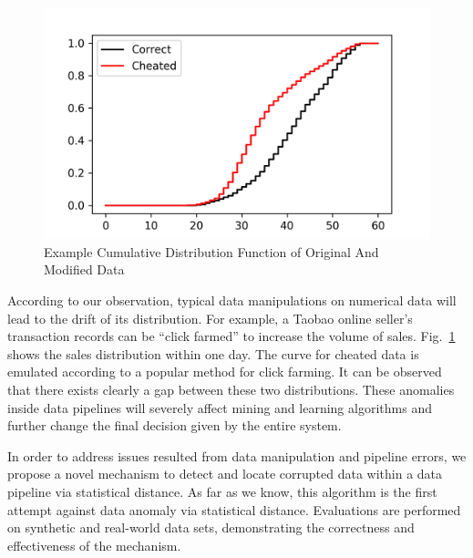 \documentclass[a4paper]{IEEEtran}
\begin{document}
		\begin{figure}[!t]
			\centering
			\includegraphics[width=\linewidth]{fig/ExampleEcdf.png}
			\caption{Example Cumulative Distribution Function of Original And Modified Data}
			\label{fig:example-ecdf}
		\end{figure}
		
		According to our observation, typical data manipulations on numerical data will lead to the drift of its distribution. For example, a Taobao online seller's transaction records can be ``click farmed'' to increase the volume of sales. Fig.~\ref{fig:example-ecdf} shows the sales distribution within one day. The curve for cheated data is emulated according to a popular method for click farming. It can be observed that there exists clearly a gap between these two distributions. 		
		These anomalies inside data pipelines will severely affect mining and learning algorithms and further change the final decision given by the entire system.
		
		In order to address issues resulted from data manipulation and pipeline errors, we propose a novel mechanism to detect and locate corrupted data within a data pipeline via statistical distance. As far as we know, this algorithm is the first attempt against data anomaly via statistical distance. Evaluations are performed on synthetic and real-world data sets, demonstrating the correctness and effectiveness of the mechanism.
		
\end{document}
